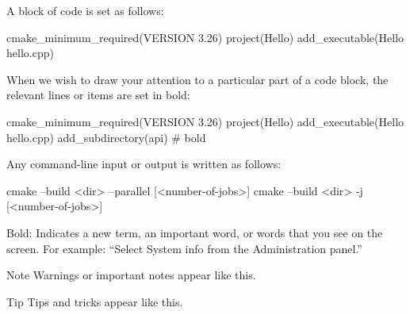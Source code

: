 A block of code is set as follows:

\begin{cmake}
cmake_minimum_required(VERSION 3.26)
project(Hello)
add_executable(Hello hello.cpp)
\end{cmake}

When we wish to draw your attention to a particular part of a code block, the relevant lines or items are set in bold:

\begin{cmake}
cmake_minimum_required(VERSION 3.26)
project(Hello)
add_executable(Hello hello.cpp)
add_subdirectory(api) # bold
\end{cmake}

Any command-line input or output is written as follows:

\begin{shell}
cmake --build <dir> --parallel [<number-of-jobs>]
cmake --build <dir> -j [<number-of-jobs>]
\end{shell}

Bold: Indicates a new term, an important word, or words that you see on the screen. For example: “Select System info from the Administration panel.”

\begin{myNotic}{Note}
Warnings or important notes appear like this.
\end{myNotic}


\begin{myTip}{Tip}
Tips and tricks appear like this.
\end{myTip}






